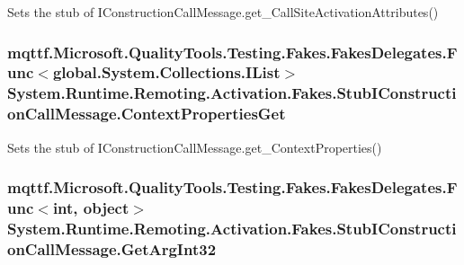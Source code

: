 Sets the stub of I\-Construction\-Call\-Message.\-get\-\_\-\-Call\-Site\-Activation\-Attributes()

\hypertarget{class_system_1_1_runtime_1_1_remoting_1_1_activation_1_1_fakes_1_1_stub_i_construction_call_message_a517366d369be47595aee9811bab7cfd7}{
\subsubsection[{Context\-Properties\-Get}]{\setlength{\rightskip}{0pt plus 5cm}mqttf.\-Microsoft.\-Quality\-Tools.\-Testing.\-Fakes.\-Fakes\-Delegates.\-Func$<$global.\-System.\-Collections.\-I\-List$>$ System.\-Runtime.\-Remoting.\-Activation.\-Fakes.\-Stub\-I\-Construction\-Call\-Message.\-Context\-Properties\-Get}}\label{class_system_1_1_runtime_1_1_remoting_1_1_activation_1_1_fakes_1_1_stub_i_construction_call_message_a517366d369be47595aee9811bab7cfd7}


Sets the stub of I\-Construction\-Call\-Message.\-get\-\_\-\-Context\-Properties()

\hypertarget{class_system_1_1_runtime_1_1_remoting_1_1_activation_1_1_fakes_1_1_stub_i_construction_call_message_a7e93ceef65654f43a2cce4263d429168}{
\subsubsection[{Get\-Arg\-Int32}]{\setlength{\rightskip}{0pt plus 5cm}mqttf.\-Microsoft.\-Quality\-Tools.\-Testing.\-Fakes.\-Fakes\-Delegates.\-Func$<$int, object$>$ System.\-Runtime.\-Remoting.\-Activation.\-Fakes.\-Stub\-I\-Construction\-Call\-Message.\-Get\-Arg\-Int32}}\label{class_system_1_1_runtime_1_1_remoting_1_1_activation_1_1_fakes_1_1_stub_i_construction_call_message_a7e93ceef65654f43a2cce4263d429168}


